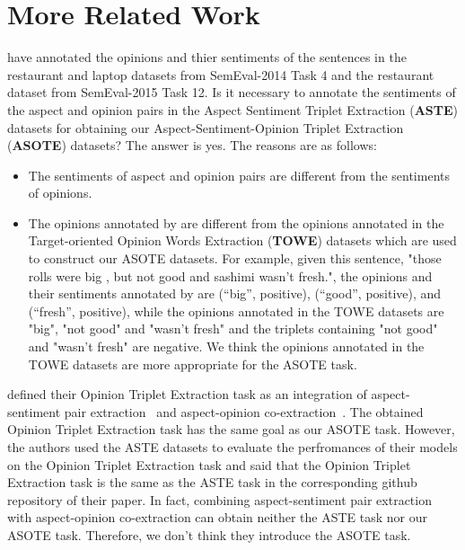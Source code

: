\documentclass[11pt]{article}
\begin{document}
\section{More Related Work}
\label{sec:More_Related_Work}
\citet{wang2016recursive, wang2017coupled} have annotated the opinions and thier sentiments of the sentences in the restaurant and laptop datasets from SemEval-2014 Task 4\citep{pontiki-etal-2014-semeval} and the restaurant dataset from SemEval-2015 Task 12\citep{pontiki-etal-2015-semeval}. Is it necessary to annotate the sentiments of the aspect and opinion pairs in the Aspect Sentiment Triplet Extraction (\textbf{ASTE}) datasets for obtaining our Aspect-Sentiment-Opinion Triplet Extraction (\textbf{ASOTE}) datasets? The answer is yes. The reasons are as follows:
\begin{itemize}
	\item The sentiments of aspect and opinion pairs are different from the sentiments of opinions.
	\item The opinions annotated by \citet{wang2016recursive, wang2017coupled} are different from the opinions annotated in the Target-oriented Opinion Words Extraction (\textbf{TOWE}) datasets \citep{fan2019target} which are used to construct our ASOTE datasets. For example, given this sentence, "those rolls were big , but not good and sashimi wasn't fresh.", the opinions and their sentiments annotated by \citet{wang2016recursive, wang2017coupled} are (``big'', positive), (``good'', positive), and (``fresh'', positive), while the opinions annotated in the TOWE datasets are "big", "not good" and "wasn't fresh" and the triplets containing "not good" and "wasn't fresh" are negative. We think the opinions annotated in the TOWE datasets are more appropriate for the ASOTE task.
\end{itemize}

\citet{zhang-etal-2020-multi-task}  defined their Opinion Triplet Extraction task as an integration of aspect-sentiment pair extraction~\citep{zhou2019span, li2019unified, phan2020modelling} and aspect-opinion co-extraction~\citep{wang2016recursive, wang2017coupled, dai2019neural}. The obtained Opinion Triplet Extraction task has the same goal as our ASOTE task. However, the authors used the ASTE datasets to evaluate the perfromances of their models on the Opinion Triplet Extraction task and said that the Opinion Triplet Extraction task is the same as the ASTE task in the corresponding github repository of their paper. In fact, combining aspect-sentiment pair extraction with aspect-opinion co-extraction can obtain neither the ASTE task nor our ASOTE task. Therefore, we don't think they introduce the ASOTE task.
\end{document}
